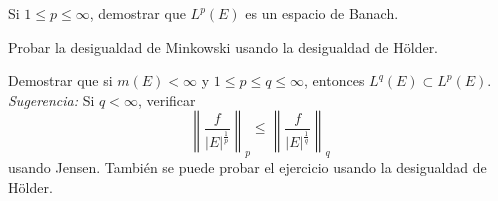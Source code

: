 \documentclass{book}
\newcommand{\rr}{\mathbb{R}}
\begin{document}
\begin{ejer}{} 
Si $1\leq p \leq \infty$, demostrar que
		$L^p(E)$ es un espacio de Banach.
	\end{ejer}
	
	
	\begin{ejer}{}
	Probar la desigualdad de Minkowski usando la desigualdad de H\"older.
	\end{ejer}
	
	\begin{ejer}{}
 Demostrar que si $m(E)<\infty$ y $1\leq p\leq q \leq \infty$, entonces 
$L^{q}(E)\subset L^{p}(E)$.
\\
{\it Sugerencia:} Si $q<\infty$, verificar 
$$\left\|\frac{f}{|E|^{\frac{1}{p}}}\right\|_p\leq
\left\|\frac{f}{|E|^{\frac{1}{q}}}\right\|_q$$
usando Jensen.
Tambi\'en se puede probar el ejercicio usando la desigualdad de H\"older.
\end{ejer}

\end{document}
